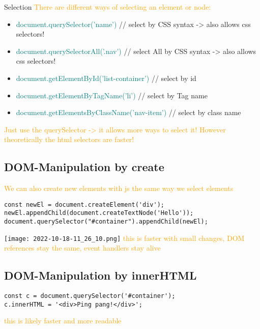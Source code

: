 \documentclass[main.tex,fontsize=6pt,paper=a4,paper=landscape,DIV=calc,]{scrartcl}
\begin{document}
\begin{multicols*}{4}
Selection 
\textcolor{orange}{There are different ways of selecting an element or node:}
\begin{itemize}
  \item \textcolor{teal}{document.querySelector('name')} // select by CSS syntax -> also allows css selectors!
  \item \textcolor{teal}{document.querySelectorAll('.nav')} // select All by CSS syntax -> also allows css selectors!
  \item \textcolor{teal}{document.getElementById('list-container')} // select by id
  \item \textcolor{teal}{document.getElementByTagName('li')} // select by Tag name
  \item \textcolor{teal}{document.getElementsByClassName('nav-item')} // select by class name
\end{itemize}
\textcolor{orange}{Just use the querySelector -> it allows more ways to select it! \newline
However theoretically the html selectors are faster!}

\subsection{DOM-Manipulation by create}  
\textcolor{orange}{We can also create new elements with js the same way we select elements}
\vspace{-2mm}
\begin{lstlisting}
const newEl = document.createElement('div');
newEl.appendChild(document.createTextNode('Hello'));
document.querySelector("#container").appendChild(newEl);
\end{lstlisting}
\vspace{2mm}
\texttt{[image: 2022-10-18-11\_26\_10.png]}\newline 
\textcolor{orange}{this is faster with small changes, DOM references stay the same, event handlers stay alive}

\subsection{DOM-Manipulation by innerHTML}  
\vspace{-2mm}
\begin{lstlisting}
const c = document.querySelector('#container');
c.innerHTML = '<div>Ping pang!</div>';
\end{lstlisting}
\vspace{2mm}
\textcolor{orange}{this is likely faster and more readable}
 

\end{multicols*}
\end{document}
